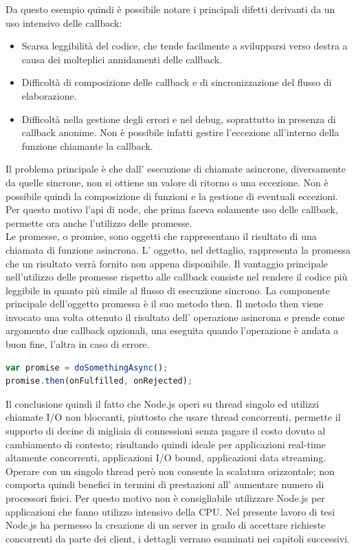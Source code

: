 Da questo esempio quindi è possibile notare i principali difetti derivanti da un uso intensivo delle callback:
\begin{itemize}
\item Scarsa leggibilità del codice, che tende facilmente a svilupparsi verso destra a causa dei molteplici annidamenti delle callback.
\item Difficoltà di composizione delle callback e di sincronizzazione del flusso di elaborazione.
\item Difficoltà nella gestione degli errori e nel debug, soprattutto in presenza di callback anonime. Non è possibile infatti gestire l’eccezione all’interno della funzione chiamante la callback.
\end{itemize}
Il problema principale è che dall’ esecuzione di chiamate asincrone, diversamente da quelle sincrone, non si ottiene un valore di ritorno o una eccezione. Non è possibile quindi la composizione di funzioni e la gestione di eventuali eccezioni.
Per questo motivo l’api di node, che prima faceva solamente uso delle callback, permette ora anche l’utilizzo delle promesse.
\\
Le promesse, o promise, sono oggetti che rappresentano il risultato di una chiamata di funzione asincrona. L’ oggetto, nel dettaglio, rappresenta la promessa che un risultato verrà fornito non appena disponibile.
Il vantaggio principale nell’utilizzo delle promesse rispetto alle callback consiste nel rendere il codice più leggibile in quanto più simile al flusso di esecuzione sincrono.
La componente principale dell’oggetto promessa è il suo metodo then. 
Il metodo then viene invocato una volta ottenuto il risultato dell’ operazione asincrona e prende come argomento due callback opzionali, una eseguita quando l’operazione è andata a buon fine, l’altra in caso di errore.
\begin{lstlisting}[language=javascript]
var promise = doSomethingAsync();
promise.then(onFulfilled, onRejected);
\end{lstlisting}
Il conclusione quindi il fatto che Node.js operi su thread singolo ed utilizzi chiamate I/O non bloccanti, piuttosto che usare thread concorrenti, permette il supporto di decine di migliaia di connessioni senza pagare il costo dovuto al cambiamento di contesto; risultando quindi ideale per applicazioni real-time altamente concorrenti, applicazioni I/O bound, applicazioni data streaming. Operare con un singolo thread però non consente la scalatura orizzontale; non comporta quindi benefici in termini di prestazioni all’ aumentare numero di processori fisici. 
Per questo motivo non è consigliabile utilizzare Node.js per applicazioni che fanno utilizzo intensivo della CPU.
Nel presente lavoro di tesi Node.js ha permesso la creazione di un server in grado di accettare richieste concorrenti da parte dei client, i dettagli verrano esaminati nei capitoli successivi.

